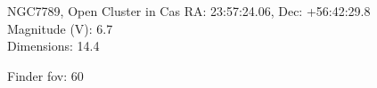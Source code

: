 \begin{block}{NGC7789, Open Cluster in Cas}
    RA: 23:57:24.06, Dec: +56:42:29.8 \\ 
    Magnitude (V): 6.7 \\ 
    Dimensions: 14.4 

    Finder fov: 60 
\end{block}